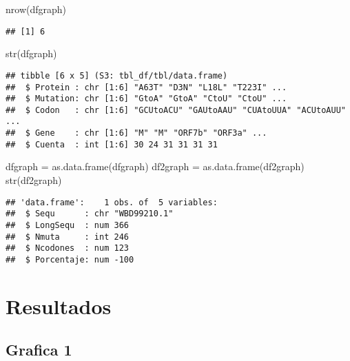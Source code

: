\documentclass[
]{article}
\newenvironment{Shaded}{\begin{snugshade}}{\end{snugshade}}
\newcommand{\FunctionTok}[1]{\textcolor[rgb]{0.00,0.00,0.00}{#1}}
\newcommand{\NormalTok}[1]{#1}
\newcommand{\OtherTok}[1]{\textcolor[rgb]{0.56,0.35,0.01}{#1}}
\begin{document}
\begin{Shaded}
\begin{Highlighting}[]
\FunctionTok{nrow}\NormalTok{(dfgraph)}
\end{Highlighting}
\end{Shaded}

\begin{verbatim}
## [1] 6
\end{verbatim}

\begin{Shaded}
\begin{Highlighting}[]
\FunctionTok{str}\NormalTok{(dfgraph)}
\end{Highlighting}
\end{Shaded}

\begin{verbatim}
## tibble [6 x 5] (S3: tbl_df/tbl/data.frame)
##  $ Protein : chr [1:6] "A63T" "D3N" "L18L" "T223I" ...
##  $ Mutation: chr [1:6] "GtoA" "GtoA" "CtoU" "CtoU" ...
##  $ Codon   : chr [1:6] "GCUtoACU" "GAUtoAAU" "CUAtoUUA" "ACUtoAUU" ...
##  $ Gene    : chr [1:6] "M" "M" "ORF7b" "ORF3a" ...
##  $ Cuenta  : int [1:6] 30 24 31 31 31 31
\end{verbatim}

\begin{Shaded}
\begin{Highlighting}[]
\NormalTok{dfgraph }\OtherTok{=} \FunctionTok{as.data.frame}\NormalTok{(dfgraph)}
\NormalTok{df2graph }\OtherTok{=} \FunctionTok{as.data.frame}\NormalTok{(df2graph)}
\FunctionTok{str}\NormalTok{(df2graph)}
\end{Highlighting}
\end{Shaded}

\begin{verbatim}
## 'data.frame':    1 obs. of  5 variables:
##  $ Sequ      : chr "WBD99210.1"
##  $ LongSequ  : num 366
##  $ Nmuta     : int 246
##  $ Ncodones  : num 123
##  $ Porcentaje: num -100
\end{verbatim}

\hypertarget{resultados-1}{%
\section{Resultados}\label{resultados-1}}

\hypertarget{grafica-1-1}{%
\subsection{Grafica 1}\label{grafica-1-1}}
\end{document}
